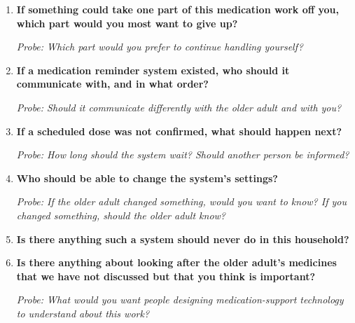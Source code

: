\begin{enumerate}[resume]
  \item \textbf{If something could take one part of this medication work off you, which part would you most want to give up?}

  \textit{Probe: Which part would you prefer to continue handling yourself?}
  \item \textbf{If a medication reminder system existed, who should it communicate with, and in what order?}

  \textit{Probe: Should it communicate differently with the older adult and with you?}
  \item \textbf{If a scheduled dose was not confirmed, what should happen next?}

  \textit{Probe: How long should the system wait? Should another person be informed?}
  \item \textbf{Who should be able to change the system's settings?}

  \textit{Probe: If the older adult changed something, would you want to know? If you changed something, should the older adult know?}
  \item \textbf{Is there anything such a system should never do in this household?}
  \item \textbf{Is there anything about looking after the older adult's medicines that we have not discussed but that you think is important?}

  \textit{Probe: What would you want people designing medication-support technology to understand about this work?}
\end{enumerate}